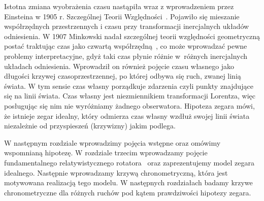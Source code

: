 Istotna zmiana wyobrażenia czasu nastąpiła wraz z wprowadzeniem przez 
Einsteina w 1905 r. Szczególnej Teorii Względności~\cite{einstein}.
Pojawiło się mieszanie współrzędnych 
przestrzennych i czasu przy transformacji 
inercjalnych układów odniesienia.
W 1907 Minkowski nadał szczególnej teorii względności 
geometryczną postać traktując czas jako czwartą 
współrzędną~\cite{minkowski2013space}, co może 
wprowadzać pewne problemy interpretacyjne, gdyż taki 
czas płynie różnie w~różnych inercjalnych 
układach odniesienia.
Wprowadził on również pojęcie czasu własnego jako długości 
krzywej czasoprzestrzennej, po której odbywa się 
ruch, zwanej linią świata.
W tym sensie czas własny porządkuje zdarzenia czyli punkty znajdujące
się na linii świata.
Czas własny jest niezmiennikiem transformacji Lorentza, 
więc posługując się
nim nie wyróżniamy żadnego obserwatora.
Hipoteza zegara
mówi, że istnieje zegar idealny, który odmierza czas własny 
wzdłuż swojej linii świata niezależnie od przyspieszeń (krzywizny)
jakim podlega.

W następnym rozdziale wprowadzimy pojęcia wstępne oraz omówimy
wspomnianą hipotezę. W rozdziale trzecim wprowadzamy pojęcie 
fundamentalnego relatywistycznego rotatora~\cite{star2008} oraz
zaprezentujemy model zegara idealnego. Następnie 
wprowadzamy krzywą chronometryczną, która jest motywowana 
realizacją tego modelu.
W następnych rozdziałach badamy krzywe chronometryczne
dla różnych ruchów pod kątem prawdziwości hipotezy zegara.
